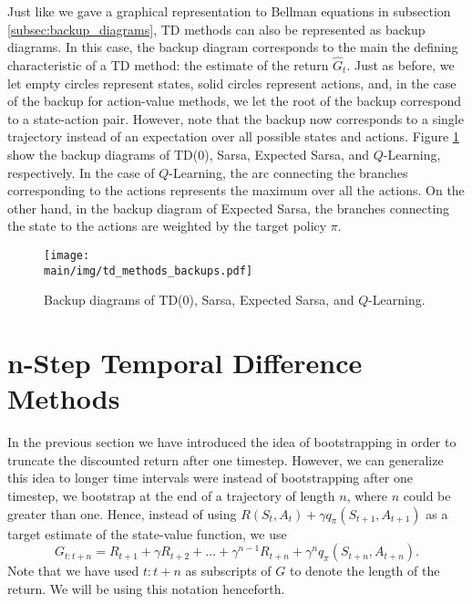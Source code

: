 Just like we gave a graphical representation to Bellman equations in subsection \ref{subsec:backup_diagrams}, TD methods can also be represented as backup diagrams.
In this case, the backup diagram corresponds to the main the defining characteristic of a TD method: the estimate of the return $\hat{G}_t$.
Just as before, we let empty circles represent states, solid circles represent actions, and, in the case of the backup for action-value methods, we let the root of the backup correspond to a state-action pair.
However, note that the backup now corresponds to a single trajectory instead of an expectation over all possible states and actions.
Figure \ref{fig:td_backups} show the backup diagrams of TD(0), Sarsa, Expected Sarsa, and $Q$-Learning, respectively. 
In the case of $Q$-Learning, the arc connecting the branches corresponding to the actions represents the maximum over all the actions.
On the other hand, in the backup diagram of Expected Sarsa, the branches connecting the state to the actions are weighted by the target policy $\pi$. 

\begin{figure}
    \centering
    \texttt{[image: \\main/img/td\_methods\_backups.pdf]}
    \caption[Backup Diagrams of TD(0), Sarsa, Expected Sarsa, and $Q$-Learning] {Backup diagrams of TD(0), Sarsa, Expected Sarsa, and $Q$-Learning.}
    \label{fig:td_backups}
\end{figure}



\section{n-Step Temporal Difference Methods}

In the previous section we have introduced the idea of bootstrapping in order to truncate the discounted return after one timestep.
However, we can generalize this idea to longer time intervals were instead of bootstrapping after one timestep, we bootstrap at the end of a trajectory of length $n$, where $n$ could be greater than one.
Hence, instead of using $R(S_t,A_t) + \gamma q_\pi(S_{t+1},A_{t+1})$ as a target estimate of the state-value function, we use
\begin{equation}
\label{eq:nstep_return}
G_{t:t+n} = R_{t+1} + \gamma R_{t+2} + ... + \gamma^{n-1} R_{t+n} + \gamma^n q_\pi(S_{t+n}, A_{t+n}).
\end{equation}
Note that we have used $t:t+n$ as subscripts of $G$ to denote the length of the return.
We will be using this notation henceforth.


